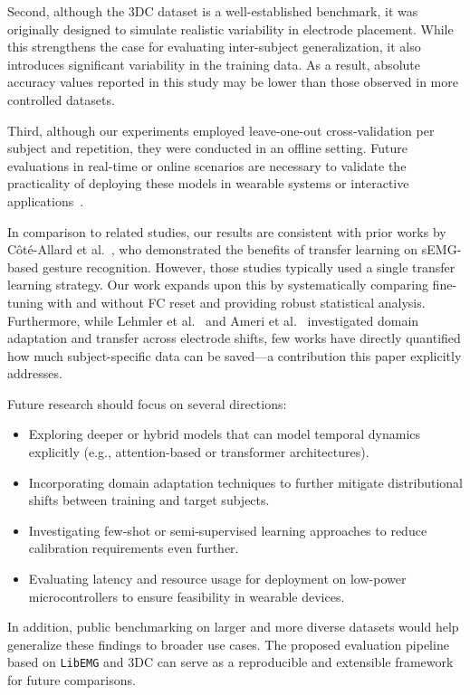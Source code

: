 \begin{multicols}{2}
Second, although the 3DC dataset is a well-established benchmark, it was originally designed to simulate realistic variability in electrode placement. While this strengthens the case for evaluating inter-subject generalization, it also introduces significant variability in the training data. As a result, absolute accuracy values reported in this study may be lower than those observed in more controlled datasets.

Third, although our experiments employed leave-one-out cross-validation per subject and repetition, they were conducted in an offline setting. Future evaluations in real-time or online scenarios are necessary to validate the practicality of deploying these models in wearable systems or interactive applications~\cite{Shen2020}.

In comparison to related studies, our results are consistent with prior works by Côté-Allard et al.~\cite{Cote2019}, who demonstrated the benefits of transfer learning on sEMG-based gesture recognition. However, those studies typically used a single transfer learning strategy. Our work expands upon this by systematically comparing fine-tuning with and without FC reset and providing robust statistical analysis. Furthermore, while Lehmler et al.~\cite{Lehmler2021} and Ameri et al.~\cite{Ameri2020} investigated domain adaptation and transfer across electrode shifts, few works have directly quantified how much subject-specific data can be saved—a contribution this paper explicitly addresses.

Future research should focus on several directions:
\begin{itemize}
    \item Exploring deeper or hybrid models that can model temporal dynamics explicitly (e.g., attention-based or transformer architectures).
    \item Incorporating domain adaptation techniques to further mitigate distributional shifts between training and target subjects.
    \item Investigating few-shot or semi-supervised learning approaches to reduce calibration requirements even further.
    \item Evaluating latency and resource usage for deployment on low-power microcontrollers to ensure feasibility in wearable devices.
\end{itemize}

In addition, public benchmarking on larger and more diverse datasets would help generalize these findings to broader use cases. The proposed evaluation pipeline based on \texttt{LibEMG} and 3DC can serve as a reproducible and extensible framework for future comparisons.


\end{multicols}
